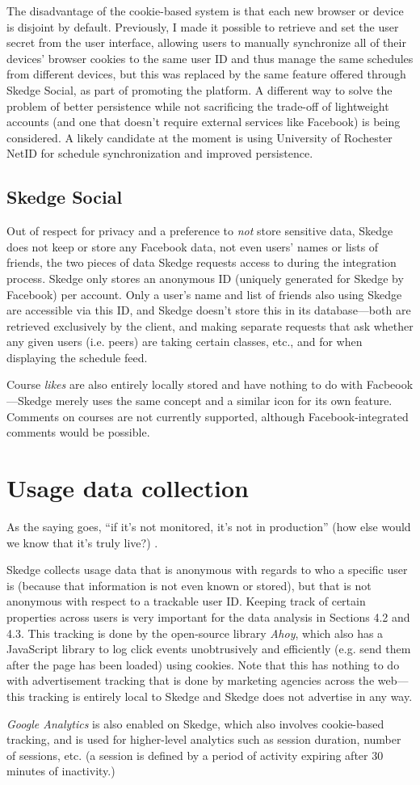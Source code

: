 The disadvantage of the cookie-based system is that each new browser or device is disjoint by default. Previously, I made it possible to retrieve and set the user secret from the user interface, allowing users to manually synchronize all of their devices' browser cookies to the same user ID and thus manage the same schedules from different devices, but this was replaced by the same feature offered through Skedge Social, as part of promoting the platform. A different way to solve the problem of better persistence while not sacrificing the trade-off of lightweight accounts (and one that doesn't require external services like Facebook) is being considered. A likely candidate at the moment is using University of Rochester NetID for schedule synchronization and improved persistence.

\subsection{Skedge Social}

Out of respect for privacy and a preference to \emph{not} store sensitive data, Skedge does not keep or store any Facebook data, not even users' names or lists of friends, the two pieces of data Skedge requests access to during the integration process. Skedge only stores an anonymous ID (uniquely generated for Skedge by Facebook) per account. Only a user’s name and list of friends also using Skedge are accessible via this ID, and Skedge doesn't store this in its database---both are retrieved exclusively by the client, and making separate requests that ask whether any given users (i.e. peers) are taking certain classes, etc., and for when displaying the schedule feed.

Course \emph{likes} are also entirely locally stored and have nothing to do with Facbeook---Skedge merely uses the same concept and a similar icon for its own feature. Comments on courses are not currently supported, although Facebook-integrated comments would be possible.

\section{Usage data collection}

As the saying goes, ``if it's not monitored, it's not in production'' (how else would we know that it's truly live?) \cite{monitored}.

Skedge collects usage data that is anonymous with regards to who a specific user is (because that information is not even known or stored), but that is not anonymous with respect to a trackable user ID. Keeping track of certain properties across users is very important for the data analysis in Sections 4.2 and 4.3. This tracking is done by the open-source library \emph{Ahoy}, which also has a JavaScript library to log click events unobtrusively and efficiently (e.g. send them after the page has been loaded) using cookies. Note that this has nothing to do with advertisement tracking that is done by marketing agencies across the web---this tracking is entirely local to Skedge and Skedge does not advertise in any way.

\emph{Google Analytics} is also enabled on Skedge, which also involves cookie-based tracking, and is used for higher-level analytics such as session duration, number of sessions, etc. (a session is defined by a period of activity expiring after 30 minutes of inactivity.)